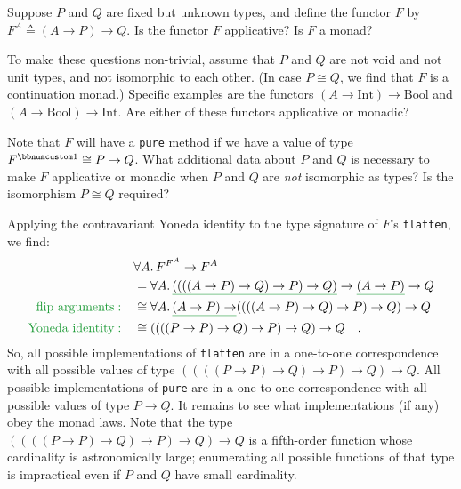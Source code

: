 Suppose $P$ and $Q$ are fixed but unknown types, and define the
functor $F$ by $F^{A}\triangleq(A\rightarrow P)\rightarrow Q$. Is
the functor $F$ applicative? Is $F$ a monad?

To make these questions non-trivial, assume that $P$ and $Q$ are
not void and not unit types, and not isomorphic to each other. (In
case $P\cong Q$, we find that $F$ is a continuation monad.) Specific
examples are the functors $(A\rightarrow\text{Int})\rightarrow\text{Bool}$
and $(A\rightarrow\text{Bool})\rightarrow\text{Int}$. Are either
of these functors applicative or monadic?

Note that $F$ will have a \lstinline!pure! method if we have a value
of type $F^{\bbnum 1}\cong P\rightarrow Q$. What additional data
about $P$ and $Q$ is necessary to make $F$ applicative or monadic
when $P$ and $Q$ are \emph{not} isomorphic as types? Is the isomorphism
$P\cong Q$ required?

Applying the contravariant Yoneda identity to the type signature of
$F$\textsf{'}s \lstinline!flatten!, we find: 
\begin{align*}
 & \forall A.\,F^{F^{A}}\rightarrow F^{A}\\
 & =\forall A.\,\gunderline{((((A\rightarrow P)\rightarrow Q)\rightarrow P)\rightarrow Q)}\rightarrow\gunderline{(A\rightarrow P)}\rightarrow Q\\
{\color{greenunder}\text{flip arguments}:}\quad & \cong\forall A.\,\gunderline{(A\rightarrow P)\rightarrow}((((A\rightarrow P)\rightarrow Q)\rightarrow P)\rightarrow Q)\rightarrow Q\\
{\color{greenunder}\text{Yoneda identity}:}\quad & \cong((((P\rightarrow P)\rightarrow Q)\rightarrow P)\rightarrow Q)\rightarrow Q\quad.
\end{align*}
So, all possible implementations of \lstinline!flatten! are in a
one-to-one correspondence with all possible values of type $((((P\rightarrow P)\rightarrow Q)\rightarrow P)\rightarrow Q)\rightarrow Q$.
All possible implementations of \lstinline!pure! are in a one-to-one
correspondence with all possible values of type $P\rightarrow Q$.
It remains to see what implementations (if any) obey the monad laws.
Note that the type $((((P\rightarrow P)\rightarrow Q)\rightarrow P)\rightarrow Q)\rightarrow Q$
is a fifth-order function whose cardinality is astronomically large;
enumerating all possible functions of that type is impractical even
if $P$ and $Q$ have small cardinality.

